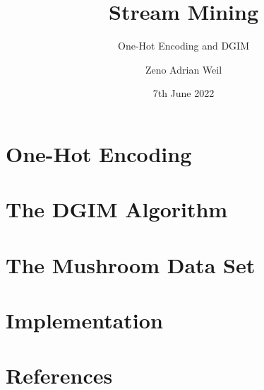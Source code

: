 \documentclass[
	9pt,
	a4paper,
]{beamer}
\title{Stream Mining}
\subtitle{One-Hot Encoding and DGIM}
\author{Zeno Adrian Weil}
\institute{Data Science 1 \\ Goethe University Frankfurt}
\date{7th June 2022}
\begin{document}
	\begin{frame}[plain]
		\titlepage
	\end{frame}

	\section{One-Hot Encoding}
	

	\section{The DGIM Algorithm}
	
	
	\section{The Mushroom Data Set}
	
	
	\section{Implementation}
	

	\section{References}
	
\end{document}
